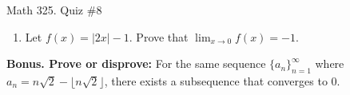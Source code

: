 \documentclass[12pt]{amsart}
\begin{document}
	
	\thispagestyle{empty}
	
	\begin{center}
		\Large{Math 325. Quiz \#8 }\\

	\end{center}
	
	
	
	\bigskip
	
	\begin{enumerate}
	
	\item Let $f(x) = | 2x |  -1 $. Prove that $\displaystyle\lim_{x \to 0} f(x) = -1$.

\vfill
















\end{enumerate}

\newpage

\noindent \textbf{Bonus. Prove or disprove:}
For the same sequence $\{a_n\}_{n=1}^\infty$ where  $a_n =  n \sqrt{2} - \lfloor n \sqrt{2} \rfloor$, there exists a subsequence that converges to $0$.
	
	
\end{document}
